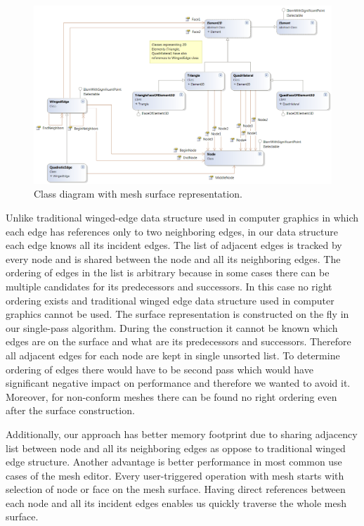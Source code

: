 \begin{figure}[H]
\centering
\includegraphics[width=\textwidth]{figures/appendix-mesh-visualization/figure3}
\decoRule
\caption[Class diagram of surface representation]{Class diagram with mesh surface representation.}
\label{fig:class-diagram-surface}
\end{figure}

Unlike traditional winged-edge data structure used in computer graphics in which each edge has references only to two neighboring edges, in our data structure each edge knows all its incident edges. The list of adjacent edges is tracked by every node and is shared between the node and all its neighboring edges. The ordering of edges in the list is arbitrary because in some cases there can be multiple candidates for its predecessors and successors. In this case no right ordering exists and traditional winged edge data structure used in computer graphics cannot be used. The surface representation is constructed on the fly in our single-pass algorithm. During the construction it cannot be known which edges are on the surface and what are its predecessors and successors. Therefore all adjacent edges for each node are kept in single unsorted list. To determine ordering of edges there would have to be second pass which would have significant negative impact on performance and therefore we wanted to avoid it. Moreover, for non-conform meshes there can be found no right ordering even after the surface construction.

Additionally, our approach has better memory footprint due to sharing adjacency list between node and all its neighboring edges as oppose to traditional winged edge structure. Another advantage is better performance in most common use cases of the mesh editor. Every user-triggered operation with mesh starts with selection of node or face on the mesh surface. Having direct references between each node and all its incident edges enables us quickly traverse the whole mesh surface.

